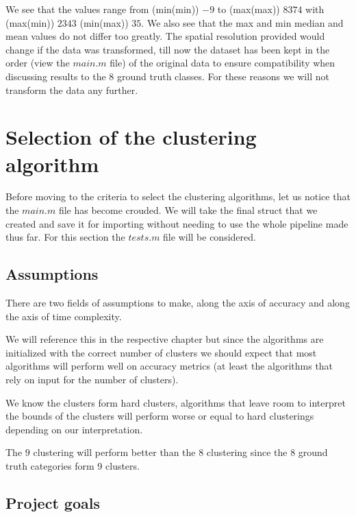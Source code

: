 \documentclass[12pt, a4paper]{article}
\begin{document}
We see that the values range from (min(min)) $-9$ to (max(max)) $8374$ with (max(min)) $2343$ (min(max)) $35$. We also see that the max and min median and mean values do not differ too greatly. The spatial resolution provided would change if the data was transformed, till now the dataset has been kept in the order (view the $main.m$ file) of the original data to ensure compatibility when discussing results to the 8 ground truth classes. For these reasons we will not transform the data any further.

\section{Selection of the clustering algorithm}

Before moving to the criteria to select the clustering algorithms, let us notice that the $main.m$ file has become crouded. We will take the final struct that we created and save it for importing without needing to use the whole pipeline made thus far. For this section the $tests.m$ file will be considered.

\subsection{Assumptions}

There are two fields of assumptions to make, along the axis of accuracy and along the axis of time complexity.
\newline

We will reference this in the respective chapter but since the algorithms are initialized with the correct number of clusters we should expect that most algorithms will perform well on accuracy metrics (at least the algorithms that rely on input for the number of clusters).
\newline

We know the clusters form hard clusters, algorithms that leave room to interpret the bounds of the clusters will perform worse or equal to hard clusterings depending on our interpretation.
\newline

The $9$ clustering will perform better than the 8 clustering since the $8$ ground truth categories form 9 clusters.
\newline

\subsection{Project goals}
\end{document}
